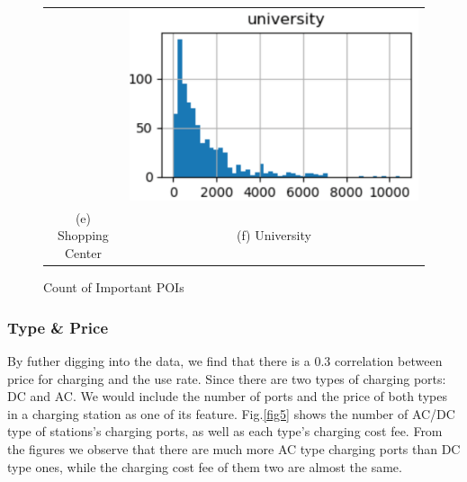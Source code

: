 \documentclass[runningheads]{llncs}
\begin{document}
\begin{figure}[!htbp]
\begin{tabular}{cc}
		&
		\includegraphics[width=0.45\columnwidth]{./figures/university.pdf} \\
		(e) Shopping Center & (f) University
	\end{tabular}
	\centering
	\caption{Count of Important POIs}
	\label{fig4}
\end{figure}

\subsubsection{Type \& Price}
By futher digging into the data, we find that there is a 0.3 correlation between price for charging and the use rate. Since there are two types of charging ports: DC and AC. We would include the number of ports and the price of both types in a charging station as one of its feature. Fig.\ref{fig5} shows the number of AC/DC type of stations's charging ports, as well as each type's charging cost fee. From the figures we observe that there are much more AC type charging ports than DC type ones, while the charging cost fee of them two are almost the same.
\end{document}
